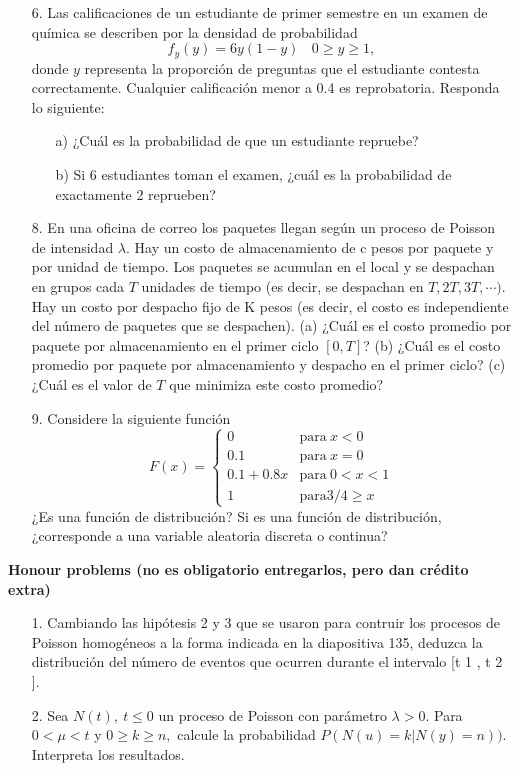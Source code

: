 \documentclass[11pt,letterpaper]{article}
\begin{document}
\begin{itemize}
\item[6.] Las calificaciones de un estudiante de primer semestre en un examen de química se describen
por la densidad de probabilidad
$$f_y(y)=6y(1-y)\ \ \ \ 0\geq y \geq 1,$$
donde $y$ representa la proporción de preguntas que el estudiante contesta correctamente. Cualquier calificación menor a 0.4 es reprobatoria. Responda lo siguiente:
\begin{itemize}
\item[a)] ¿Cuál es la probabilidad de que un estudiante repruebe?
\item[b)] Si 6 estudiantes toman el examen, ¿cuál es la probabilidad de exactamente 2 reprueben?
\end{itemize}

\item[8.] En una oficina de correo los paquetes llegan según un proceso de Poisson de intensidad $\lambda$. Hay un costo de almacenamiento de c pesos por paquete y por unidad de tiempo. Los paquetes se acumulan en el local y se despachan en grupos cada $T$ unidades de tiempo (es decir, se despachan en $T , 2T , 3T , \cdots)$. Hay un costo por despacho fijo de K pesos (es decir, el costo es independiente del número de paquetes que se despachen). (a) ¿Cuál es el costo promedio por paquete por almacenamiento en el primer ciclo $[0, T ]$? (b) ¿Cuál es el costo promedio por paquete por almacenamiento y despacho en el primer ciclo? (c) ¿Cuál es el valor de $T$ que minimiza este costo promedio?


\item[9.] Considere la siguiente función
\begin{equation*}
F(x)=\left\{ \begin{array}{cl}
0 & \text{para} \ x<0\\
0.1 & \text{para} \ x=0\\
0.1+0.8x & \text{para} \ 0<x<1\\
1 & \text{para} 3/4\geq x
\end{array} \right.
\end{equation*}
¿Es una función de distribución? Si es una función de distribución, ¿corresponde a una variable
aleatoria discreta o continua?

\end{itemize}


\textbf{Honour problems (no es obligatorio entregarlos, pero dan crédito extra)}\\

\begin{itemize}
\item[1.] Cambiando las hipótesis 2 y 3 que se usaron para contruir los procesos de Poisson homogéneos
a la forma indicada en la diapositiva 135, deduzca la distribución del número de eventos que
ocurren durante el intervalo [t 1 , t 2 ].

\item[2.] Sea $N(t), \ t\leq 0$ un proceso de Poisson con parámetro $\lambda >0$. Para $0<\mu <t$ y $0\geq k\geq n,$ calcule la probabilidad $P(N(u)=k|N(y)=n)).$ Interpreta los resultados.
\end{itemize}
\end{document}
